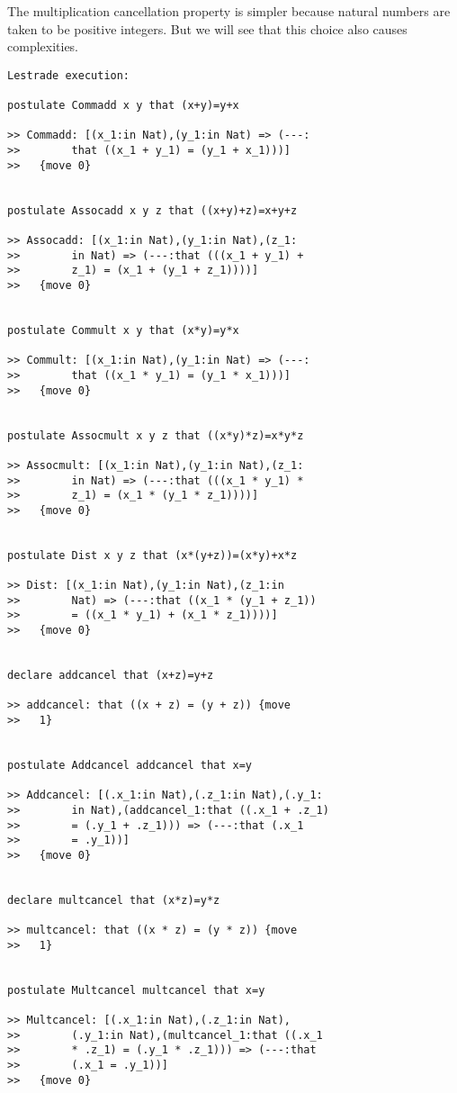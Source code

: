 \documentclass[12pt]{article}
\begin{document}
The multiplication cancellation property is simpler because natural numbers are taken to be positive integers.  But we will see that
this choice also causes complexities.

\begin{verbatim}Lestrade execution:

postulate Commadd x y that (x+y)=y+x

>> Commadd: [(x_1:in Nat),(y_1:in Nat) => (---:
>>        that ((x_1 + y_1) = (y_1 + x_1)))]
>>   {move 0}


postulate Assocadd x y z that ((x+y)+z)=x+y+z

>> Assocadd: [(x_1:in Nat),(y_1:in Nat),(z_1:
>>        in Nat) => (---:that (((x_1 + y_1) + 
>>        z_1) = (x_1 + (y_1 + z_1))))]
>>   {move 0}


postulate Commult x y that (x*y)=y*x

>> Commult: [(x_1:in Nat),(y_1:in Nat) => (---:
>>        that ((x_1 * y_1) = (y_1 * x_1)))]
>>   {move 0}


postulate Assocmult x y z that ((x*y)*z)=x*y*z

>> Assocmult: [(x_1:in Nat),(y_1:in Nat),(z_1:
>>        in Nat) => (---:that (((x_1 * y_1) * 
>>        z_1) = (x_1 * (y_1 * z_1))))]
>>   {move 0}


postulate Dist x y z that (x*(y+z))=(x*y)+x*z

>> Dist: [(x_1:in Nat),(y_1:in Nat),(z_1:in 
>>        Nat) => (---:that ((x_1 * (y_1 + z_1)) 
>>        = ((x_1 * y_1) + (x_1 * z_1))))]
>>   {move 0}


declare addcancel that (x+z)=y+z

>> addcancel: that ((x + z) = (y + z)) {move 
>>   1}


postulate Addcancel addcancel that x=y

>> Addcancel: [(.x_1:in Nat),(.z_1:in Nat),(.y_1:
>>        in Nat),(addcancel_1:that ((.x_1 + .z_1) 
>>        = (.y_1 + .z_1))) => (---:that (.x_1 
>>        = .y_1))]
>>   {move 0}


declare multcancel that (x*z)=y*z

>> multcancel: that ((x * z) = (y * z)) {move 
>>   1}


postulate Multcancel multcancel that x=y

>> Multcancel: [(.x_1:in Nat),(.z_1:in Nat),
>>        (.y_1:in Nat),(multcancel_1:that ((.x_1 
>>        * .z_1) = (.y_1 * .z_1))) => (---:that 
>>        (.x_1 = .y_1))]
>>   {move 0}


\end{verbatim}
\end{document}
